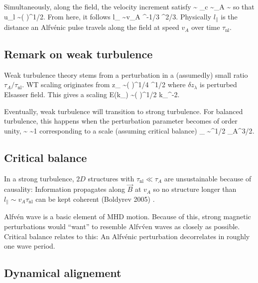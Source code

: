 \documentclass[usenatbib,twocolumn]{aastex63}
\begin{document}
Simultaneously, along the field, the velocity increment satisfy
\be
{} \sim \epsilon \quad{}\quad
\tau_c \sim \tau_A \sim {}
\ee
so that
\be
\delta u_{l \parallel} \sim \left(  \right)^{1/2}.
\ee
From here, it follows
\be
l_{\parallel} \sim v_A \epsilon^{-1/3} \lambda^{2/3}.
\ee
Physically $l_{\parallel}$ is the distance an Alfv\'enic pulse travels along the field at speed $v_A$ over time $\tau_{\mathrm{nl}}$.


\subsection{Remark on weak turbulence}


Weak turbulence theory stems from a perturbation in a (assumedly) small ratio $\tau_A/\tau_{\mathrm{nl}}$.
WT scaling originates from
\be
\delta z_{\lambda} \sim \left(  \right)^{1/4} \lambda^{1/2}
\ee
where $\delta z_{\lambda}$ is perturbed Elsasser field.
This gives a scaling
\be
E(k_{\perp}) \sim \left(  \right)^{1/2} k_{\perp}^{-2}.
\ee

Eventually, weak turbulence will transition to strong turbulence.
For balanced turbulence, this happens when the perturbation parameter becomes of order unity,
\be
{} \sim {} \sim 1
\ee
corresponding to a scale (assuming critical balance)
\be
\lambda_{} \sim \epsilon^{1/2} \tau_A^{3/2}.
\ee


\subsection{Critical balance}

In a strong turbulence, $2D$ structures with $\tau_{\mathrm{nl}} \ll \tau_A$ are unsustainable because of causality:
Information propagates along $\vec{B}$ at $v_A$ so no structure longer than $l_{\parallel} \sim v_A \tau_{\mathrm{nl}}$ can be kept coherent (Boldyrev 2005) \citep{Boldyrev_2005}.


Alfv\'en wave is a basic element of MHD motion.
Because of this, strong magnetic perturbations would ``want'' to resemble Alfv\'ven waves as closely as possible.
Critical balance relates to this:
An Alfv\'enic perturbation decorrelates in roughly one wave period.

\subsection{Dynamical alignement}
\end{document}
